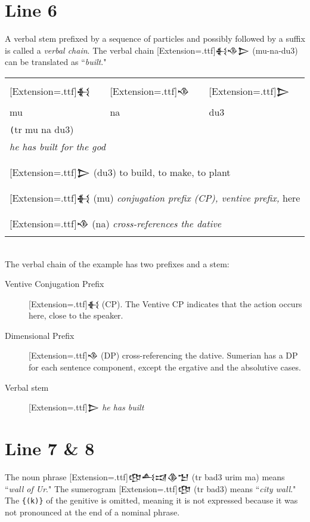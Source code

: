 \documentclass[a4paper,12pt]{book}
\newcommand{\fcn}{\setmainfont{Akkadian}[Extension=.ttf]}
\begin{document}
\newpage
\section{Line 6}
A verbal stem prefixed by a sequence of
particles and possibly followed by a suffix
is called a {\em verbal chain}. The verbal
chain {\fcn 𒈬𒈾𒆕} (mu-na-du3) can be translated
as ``{\em built}."\\

\begin{tabular}[!h]{l l l}
\fcn\Large 𒈬
&\fcn\Large 𒈾 &\fcn\Large 𒆕\\
  mu & na & du3\\
\multicolumn{3}{l}{\texttt (tr mu na du3)}\\
\multicolumn{3}{l}{\em he has built for the god}\\
\hline\\
\multicolumn{3}{l}{{\fcn 𒆕}
                    (du3) to build, to make, to plant }\\
\multicolumn{3}{l}{{\fcn 𒈬}
  (mu) {\em conjugation prefix (CP), ventive prefix,}
            here}\\
\multicolumn{3}{l}{{\fcn 𒈾}
                    (na) {\em cross-references the dative} }\\
\end{tabular}


\verb||\\
The verbal chain of the example has two
prefixes and a stem:\\

\begin{description}
\item[Ventive Conjugation Prefix] {\fcn 𒈬}   (CP).
  The Ventive CP indicates that the action occurs
  here, close to the speaker.
\item[Dimensional Prefix] {\fcn 𒈾}
  (DP) cross-referencing
  the dative. Sumerian has a DP for each sentence component,
  except the ergative and the absolutive cases.
\item[Verbal stem] {\fcn 𒆕}  {\em he has built}
\end{description}

\section{Line 7 \& 8}
The noun phrase {\fcn 𒂦𒋀𒀕𒆠𒈠}
(tr bad3 urim ma) means ``{\em wall of Ur}."
The sumerogram {\fcn 𒂦} (tr bad3) means
``{\em city wall}." The \verb|{(k)}| of the
genitive is omitted, meaning it is not expressed
because it was not pronounced at
the end of a nominal phrase.\\
\end{document}
